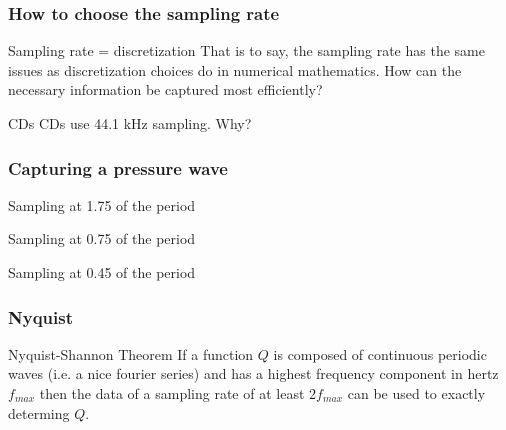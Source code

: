 \documentclass[10pt]{beamer}
\begin{document}
\begin{frame}
\frametitle{How to choose the sampling rate}
\begin{block}{Sampling rate = discretization}
That is to say, the sampling rate has the same issues as discretization choices do in numerical mathematics. How can the necessary information be captured most efficiently?
\end{block}

\begin{block}{CDs}
CDs use 44.1 kHz sampling. Why?
\end{block}
\end{frame}

\begin{frame}
\frametitle{Capturing a pressure wave}
\begin{block}{Sampling at 1.75 of the period}
\end{block}

\begin{block}{Sampling at 0.75 of the period}
\end{block}

\begin{block}{Sampling at 0.45 of the period}
\end{block}
\end{frame}

\begin{frame}
\frametitle{Nyquist}

\begin{block}{Nyquist-Shannon Theorem}
If a function $Q$ is composed of continuous periodic waves (i.e. a nice fourier series) and has a highest frequency component in hertz  $f_{max}$ then the data of a sampling rate of at least $2f_{max}$ can be used to exactly determing $Q$.
\end{block}

\end{frame}
\end{document}
